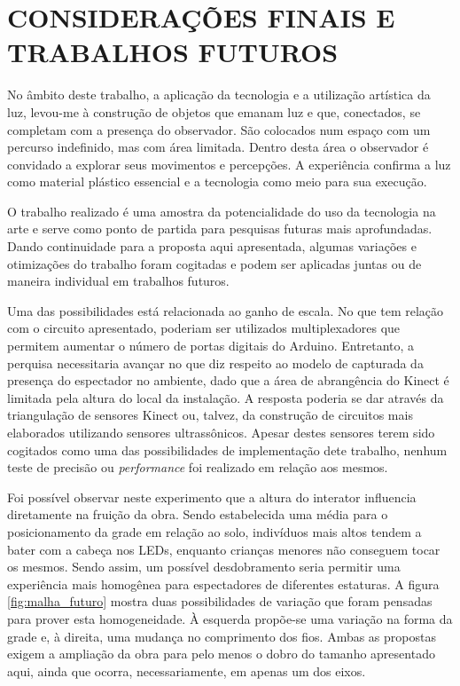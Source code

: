 \chapter{CONSIDERAÇÕES FINAIS E TRABALHOS FUTUROS}

No âmbito deste trabalho, a aplicação da tecnologia e a utilização artística da luz, levou-me à construção de objetos que emanam luz e que, conectados, se completam com a presença do observador. São colocados num espaço com um percurso indefinido, mas com área limitada. Dentro desta área o observador é convidado a explorar seus movimentos e percepções. A experiência confirma a luz como material plástico essencial e a tecnologia como meio para sua execução.

O trabalho realizado é uma amostra da potencialidade do uso da tecnologia na arte e serve como ponto de partida para pesquisas futuras mais aprofundadas. Dando continuidade para a proposta aqui apresentada, algumas variações e otimizações do trabalho foram cogitadas e podem ser aplicadas juntas ou de maneira individual em trabalhos futuros.

Uma das possibilidades está relacionada ao ganho de escala. No que tem relação com o circuito apresentado, poderiam ser utilizados multiplexadores que permitem aumentar o número de portas digitais do Arduino. Entretanto, a perquisa necessitaria avançar no que diz respeito ao modelo de capturada da presença do espectador no ambiente, dado que a área de abrangência do Kinect é limitada pela altura do local da instalação. A resposta poderia se dar através da triangulação de sensores Kinect ou, talvez, da construção de circuitos mais elaborados utilizando sensores ultrassônicos. Apesar destes sensores terem sido cogitados como uma das possibilidades de implementação dete trabalho, nenhum teste de precisão ou \textit{performance} foi realizado em relação aos mesmos.

Foi possível observar neste experimento que a altura do interator influencia diretamente na fruição da obra. Sendo estabelecida uma média para o posicionamento da grade em relação ao solo, indivíduos mais altos tendem a bater com a cabeça nos LEDs, enquanto crianças menores não conseguem tocar os mesmos. Sendo assim, um possível desdobramento seria permitir uma experiência mais homogênea para espectadores de diferentes estaturas. A figura \ref{fig:malha_futuro} mostra duas possibilidades de variação que foram pensadas para prover esta homogeneidade. À esquerda propõe-se uma variação na forma da grade e, à direita, uma mudança no comprimento dos fios. Ambas as propostas exigem a ampliação da obra para pelo menos o dobro do tamanho apresentado aqui, ainda que ocorra, necessariamente, em apenas um dos eixos. 

